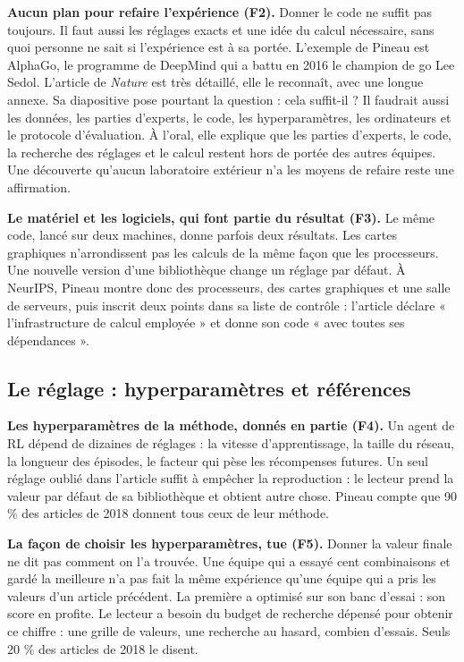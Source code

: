 \documentclass[11pt,a4paper]{article}
\begin{document}
\textbf{Aucun plan pour refaire l'expérience (F2).} Donner le code ne
suffit pas toujours. Il faut aussi les réglages exacts et une idée du
calcul nécessaire, sans quoi personne ne sait si l'expérience est à sa
portée. L'exemple de Pineau est AlphaGo, le programme de DeepMind qui a
battu en 2016 le champion de go Lee Sedol. L'article de \emph{Nature}
est très détaillé, elle le reconnaît, avec une longue annexe. Sa
diapositive pose pourtant la question : cela suffit-il ? Il faudrait
aussi les données, les parties d'experts, le code, les hyperparamètres,
les ordinateurs et le protocole d'évaluation. À l'oral, elle explique
que les parties d'experts, le code, la recherche des réglages et le
calcul restent hors de portée des autres équipes. Une découverte
qu'aucun laboratoire extérieur n'a les moyens de refaire reste une
affirmation.

\textbf{Le matériel et les logiciels, qui font partie du résultat (F3).}
Le même code, lancé sur deux machines, donne parfois deux résultats. Les
cartes graphiques n'arrondissent pas les calculs de la même façon que
les processeurs. Une nouvelle version d'une bibliothèque change un
réglage par défaut. À NeurIPS, Pineau montre donc des processeurs, des
cartes graphiques et une salle de serveurs, puis inscrit deux points
dans sa liste de contrôle : l'article déclare « l'infrastructure de
calcul employée » et donne son code « avec toutes ses dépendances ».

\subsection{Le réglage : hyperparamètres et
références}\label{le-ruxe9glage-hyperparamuxe8tres-et-ruxe9fuxe9rences}

\textbf{Les hyperparamètres de la méthode, donnés en partie (F4).} Un
agent de RL dépend de dizaines de réglages : la vitesse d'apprentissage,
la taille du réseau, la longueur des épisodes, le facteur qui pèse les
récompenses futures. Un seul réglage oublié dans l'article suffit à
empêcher la reproduction : le lecteur prend la valeur par défaut de sa
bibliothèque et obtient autre chose. Pineau compte que 90 \% des
articles de 2018 donnent tous ceux de leur méthode.

\textbf{La façon de choisir les hyperparamètres, tue (F5).} Donner la
valeur finale ne dit pas comment on l'a trouvée. Une équipe qui a essayé
cent combinaisons et gardé la meilleure n'a pas fait la même expérience
qu'une équipe qui a pris les valeurs d'un article précédent. La première
a optimisé sur son banc d'essai : son score en profite. Le lecteur a
besoin du budget de recherche dépensé pour obtenir ce chiffre : une
grille de valeurs, une recherche au hasard, combien d'essais. Seuls 20
\% des articles de 2018 le disent.
\end{document}

